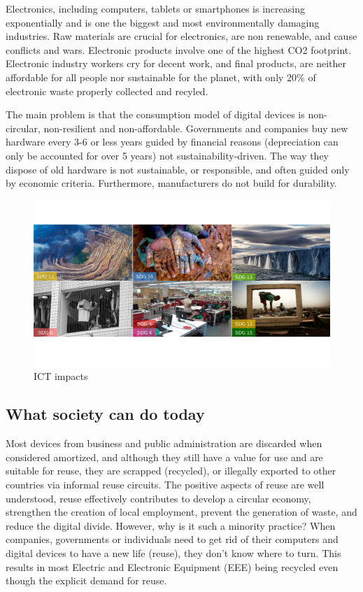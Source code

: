\documentclass[
]{book}
\begin{document}
Electronics, including computers, tablets or smartphones is increasing exponentially and is one the biggest and most environmentally damaging industries. Raw materials are crucial for electronics, are non renewable, and cause conflicts and wars. Electronic products involve one of the highest CO2 footprint. Electronic industry workers cry for decent work, and final products, are neither affordable for all people nor sustainable for the planet, with only 20\% of electronic waste properly collected and recyled.

The main problem is that the consumption model of digital devices is non-circular, non-resilient and non-affordable. Governments and companies buy new hardware every 3-6 or less years guided by financial reasons (depreciation can only be accounted for over 5 years) not sustainability-driven. The way they dispose of old hardware is not sustainable, or responsible, and often guided only by economic criteria. Furthermore, manufacturers do not build for durability.

\begin{figure}

{\centering \includegraphics[width=1\linewidth]{./figs/25} 

}

\caption{ICT impacts}\label{fig:figimpacts}
\end{figure}

\hypertarget{what-society-can-do-today}{%
\subsection{What society can do today}\label{what-society-can-do-today}}

Most devices from business and public administration are discarded when considered amortized, and although they still have a value for use and are suitable for reuse, they are scrapped (recycled), or illegally exported to other countries via informal reuse circuits. The positive aspects of reuse are well understood, reuse effectively contributes to develop a circular economy, strengthen the creation of local employment, prevent the generation of waste, and reduce the digital divide. However, why is it such a minority practice? When companies, governments or individuals need to get rid of their computers and digital devices to have a new life (reuse), they don't know where to turn. This results in most Electric and Electronic Equipment (EEE) being recycled even though the explicit demand for reuse.
\end{document}
